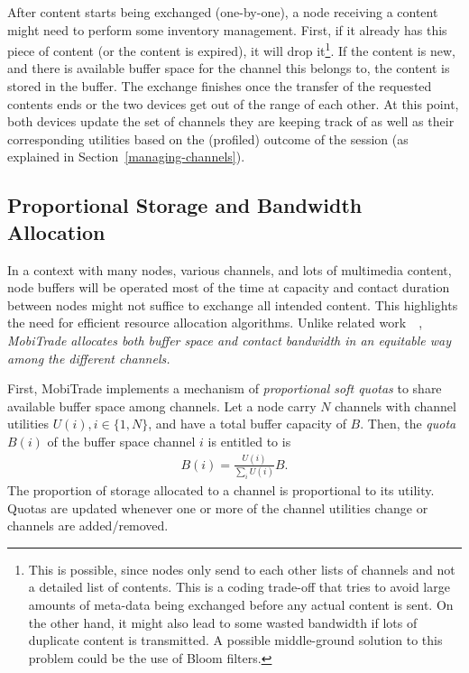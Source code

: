 After content starts being exchanged (one-by-one), a node receiving a content might need to perform some inventory management. First, if it already has this piece of content (or the content is expired), it will drop it\footnote{This is possible, since nodes only send to each other lists of channels and not a detailed list of contents. This is a coding trade-off that tries to avoid large amounts of meta-data being exchanged before any actual content is sent. On the other hand, it might also lead to some wasted bandwidth if lots of duplicate content is transmitted. A possible middle-ground solution to this problem could be the use of Bloom filters.}. If the content is new, and there is available buffer space for the channel this belongs to, the content is stored in the buffer. The exchange finishes once the transfer of the requested contents ends or the two devices get out of the range of each other. At this point, both devices update the set of channels they are keeping track of as well as their corresponding utilities based on the (profiled) outcome of the session (as explained in Section~\ref{managing-channels}).

\subsection{Proportional Storage and Bandwidth Allocation}
\label{buffer-management}

In a context with many nodes, various channels, and lots of multimedia content, node buffers will be operated most of the time at capacity and contact duration between nodes might not suffice to exchange all intended content. This highlights the need for efficient resource allocation algorithms. Unlike related work~\cite{ContentPlace}~\cite{May07wirelessopportunistic}, \emph{MobiTrade allocates both buffer space and contact bandwidth in an equitable way among the different channels.}

First, MobiTrade implements a mechanism of \emph{proportional soft quotas} to share available buffer space among channels. Let a node carry $N$ channels with channel utilities $U(i), i \in \{1,N\}$, and have a total buffer capacity of $B$. Then, the \emph{quota} $B(i)$ of the buffer space channel $i$ is entitled to is
\begin{eqnarray*}
B(i) = \frac{U(i)}{\sum_{i} U(i)} B.
\end{eqnarray*}
The proportion of storage allocated to a channel is proportional to its utility. Quotas are updated whenever one or more of the channel utilities change or channels are added/removed.

